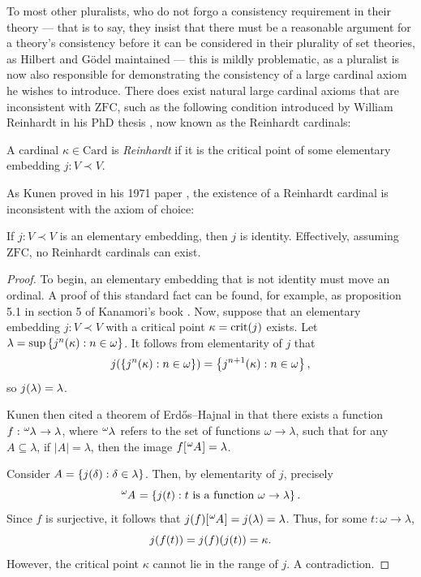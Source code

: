 \documentclass[12pt]{article}
\theoremstyle{plain}
\theoremstyle{definition}
\newcommand{\ZFC}{\mathrm{ZFC}}
\newcommand{\Card}{\mathrm{Card}}
\DeclareMathOperator{\crit}{crit}
\begin{document}
To most other pluralists, who do not forgo a consistency requirement in their theory --- that is to say, they insist that there must be a reasonable argument for a theory's consistency before it can be considered in their plurality of set theories, as Hilbert and G\"odel maintained --- this is mildly problematic, as a pluralist is now also responsible for demonstrating the consistency of a large cardinal axiom he wishes to introduce. There does exist natural large cardinal axioms that are inconsistent with $\ZFC$, such as the following condition introduced by William Reinhardt in his PhD thesis \cite{reinhardt-thesis}, now known as the Reinhardt cardinals:

\begin{definition}
	A cardinal $\kappa \in \Card$ is \emph{Reinhardt} if it is the critical point of some elementary embedding $j : V \prec V$.
\end{definition}

As Kunen proved in his 1971 paper \cite{kunen-elementary-embeddings}, the existence of a Reinhardt cardinal is inconsistent with the axiom of choice:

\begin{proposition}
	If $j : V \prec V$ is an elementary embedding, then $j$ is identity. Effectively, assuming $\ZFC$, no Reinhardt cardinals can exist.
\end{proposition}

\begin{proof}
	To begin, an elementary embedding that is not identity must move an ordinal. A proof of this standard fact can be found, for example, as proposition 5.1 in section 5 of Kanamori's book \cite{higher-infinite}. Now, suppose that an elementary embedding $j : V \prec V$ with a critical point $\kappa = \crit\mleft(j\mright)$ exists. Let $\lambda = \sup \left\{j^n\mleft(\kappa\mright) : n \in \omega\right\}$. It follows from elementarity of $j$ that
	\[j\mleft(\left\{j^n\mleft(\kappa\mright) : n \in \omega\right\}\mright) = \left\{j^{n + 1}\mleft(\kappa\mright) : n \in \omega\right\},\]
	so $j\mleft(\lambda\mright) = \lambda$.

	Kunen then cited a theorem of Erd\H{o}s--Hajnal in \cite{erdos-hajnal} that there exists a function $f : \tensor[^\omega]{\lambda}{} \rightarrow \lambda$, where $\tensor[^\omega]{\lambda}{}$ refers to the set of functions $\omega \rightarrow \lambda$, such that for any $A \subseteq \lambda$, if $\left|A\right| = \lambda$, then the image $f\mleft[\tensor[^\omega]{A}{}\mright] = \lambda$.

	Consider $A = \left\{j\mleft(\delta\mright) : \delta \in \lambda\right\}$. Then, by elementarity of $j$, precisely
	\[\tensor[^\omega]{A}{} = \left\{j\mleft(t\mright) : \text{$t$ is a function $\omega \rightarrow \lambda$}\right\}.\]
	Since $f$ is surjective, it follows that $j\mleft(f\mright)\mleft[\tensor[^\omega]{A}{}\mright] = j\mleft(\lambda\mright) = \lambda$. Thus, for some $t : \omega \rightarrow \lambda$,
	\[j\mleft(f\mleft(t\mright)\mright) = j\mleft(f\mright)\mleft(j\mleft(t\mright)\mright) = \kappa.\]
	However, the critical point $\kappa$ cannot lie in the range of $j$. A contradiction.
\end{proof}
\end{document}
